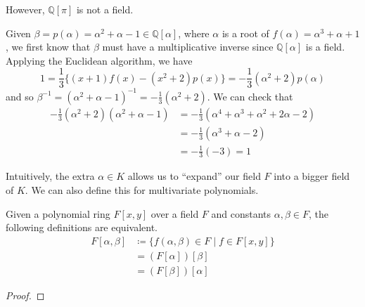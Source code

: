     \begin{example}
      However, $\mathbb{Q}[\pi]$ is not a field. 
    \end{example} 

    \begin{example}
      Given $\beta = p(\alpha) = \alpha^2 + \alpha - 1 \in \mathbb{Q}[\alpha]$, where $\alpha$ is a root of $f(\alpha) = \alpha^3 + \alpha + 1$, we first know that $\beta$ must have a multiplicative inverse since $\mathbb{Q}[\alpha]$ is a field. Applying the Euclidean algorithm, we have 
      \begin{equation}
        1 = \frac{1}{3} \big\{ (x+1) f(x) - (x^2 + 2) p(x)\big\} = -\frac{1}{3} (\alpha^2 + 2) p(\alpha)
      \end{equation}
      and so $\beta^{-1} = (\alpha^2 + \alpha - 1)^{-1} = -\frac{1}{3} (\alpha^2 + 2)$. We can check that 
      \begin{align}
        -\frac{1}{3} (\alpha^2 + 2) (\alpha^2 + \alpha - 1) & = -\frac{1}{3} (\alpha^4 + \alpha^3 + \alpha^2 + 2 \alpha - 2) \\
                                                            & = -\frac{1}{3} (\alpha^3 + \alpha - 2) \\
                                                            & = -\frac{1}{3} (-3) = 1
      \end{align}
    \end{example}

    Intuitively, the extra $\alpha \in K$ allows us to ``expand'' our field $F$ into a bigger field of $K$. We can also define this for multivariate polynomials.  

    \begin{definition}
      Given a polynomial ring $F[x, y]$ over a field $F$ and constants $\alpha, \beta \in F$, the following definitions are equivalent. 
      \begin{align}
        F[\alpha, \beta] & \coloneqq \{ f(\alpha, \beta) \in F \mid f \in F[x, y] \} \\ 
                         & = (F[\alpha])[\beta] \\
                         & = (F[\beta])[\alpha]
      \end{align}
    \end{definition}
    \begin{proof}
      
    \end{proof} 
    
